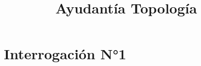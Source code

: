 \documentclass[a4paper]{report}
\title{Ayudantía Topología}
\author{}
\date{}
\begin{document}
\maketitle
\tableofcontents

	\chapter{Interrogación N°1}

	
	

\end{document}

